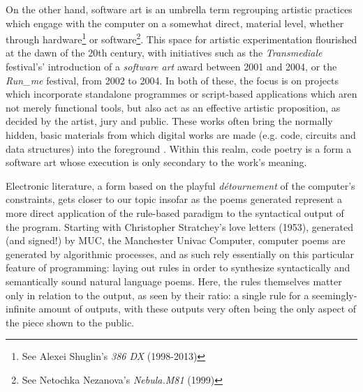 On the other hand, software art is an umbrella term regrouping artistic practices which engage with the computer on a somewhat direct, material level, whether through hardware\footnote{See Alexei Shuglin's \emph{386 DX} (1998-2013)} or software\footnote{See Netochka Nezanova's \emph{Nebula.M81} (1999)}. This space for artistic experimentation flourished at the dawn of the 20th century, with initiatives such as the \emph{Transmediale} festival's' introduction of a \emph{software art} award between 2001 and 2004, or the \emph{Run\_me} festival, from 2002 to 2004. In both of these, the focus is on projects which incorporate standalone programmes or script-based applications which aren not merely functional tools, but also act as an effective artistic proposition, as decided by the artist, jury and public. These works often bring the normally hidden, basic materials from which digital works are made (e.g. code, circuits and data structures) into the foreground \citep{yuill_code_2004}. Within this realm, code poetry is a form a software art whose execution is only secondary to the work's meaning.

Electronic literature, a form based on the playful \emph{détournement} of the computer's constraints, gets closer to our topic insofar as the poems generated represent a more direct application of the rule-based paradigm to the syntactical output of the program. Starting with Christopher Stratchey's love letters (1953), generated (and signed!) by MUC, the Manchester Univac Computer, computer poems are generated by algorithmic processes, and as such rely essentially on this particular feature of programming: laying out rules in order to synthesize syntactically and semantically sound natural language poems. Here, the rules themselves matter only in relation to the output, as seen by their ratio: a single rule for a seemingly-infinite amount of outputs, with these outputs very often being the only aspect of the piece shown to the public.


